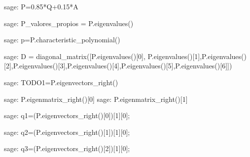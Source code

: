\begin{sagecommandline}
    sage: P=0.85*Q+0.15*A
\end{sagecommandline}

\begin{sagecommandline}
    sage: P_valores_propios = P.eigenvalues()
\end{sagecommandline}

\begin{sagecommandline}
    sage: p=P.characteristic_polynomial()
\end{sagecommandline}

\begin{sagecommandline}
    sage: D = diagonal_matrix([P.eigenvalues()[0], P.eigenvalues()[1],P.eigenvalues()[2],P.eigenvalues()[3],P.eigenvalues()[4],P.eigenvalues()[5],P.eigenvalues()[6]])
\end{sagecommandline}

\begin{sagecommandline}[\textwidth]
    sage: TODO1=P.eigenvectors_right()
\end{sagecommandline}

\begin{sagecommandline}[\textwidth]
    sage: P.eigenmatrix_right()[0]
    sage: P.eigenmatrix_right()[1]
\end{sagecommandline}
    
\begin{sagecommandline}
    sage: q1=(P.eigenvectors_right()[0])[1][0];
\end{sagecommandline}

\begin{sagecommandline}
    sage: q2=(P.eigenvectors_right()[1])[1][0];
\end{sagecommandline}

\begin{sagecommandline}
    sage: q3=(P.eigenvectors_right()[2])[1][0];
\end{sagecommandline}

